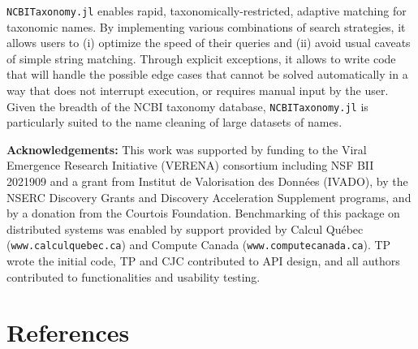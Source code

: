 \documentclass[11pt]{article}
\begin{document}
\texttt{NCBITaxonomy.jl} enables rapid, taxonomically-restricted,
adaptive matching for taxonomic names. By implementing various
combinations of search strategies, it allows users to (i) optimize the
speed of their queries and (ii) avoid usual caveats of simple string
matching. Through explicit exceptions, it allows to write code that will
handle the possible edge cases that cannot be solved automatically in a
way that does not interrupt execution, or requires manual input by the
user. Given the breadth of the NCBI taxonomy database,
\texttt{NCBITaxonomy.jl} is particularly suited to the name cleaning of
large datasets of names.

\textbf{Acknowledgements:} This work was supported by funding to the
Viral Emergence Research Initiative (VERENA) consortium including NSF
BII 2021909 and a grant from Institut de Valorisation des Données
(IVADO), by the NSERC Discovery Grants and Discovery Acceleration
Supplement programs, and by a donation from the Courtois Foundation.
Benchmarking of this package on distributed systems was enabled by
support provided by Calcul Québec (\texttt{www.calculquebec.ca}) and
Compute Canada (\texttt{www.computecanada.ca}). TP wrote the initial
code, TP and CJC contributed to API design, and all authors contributed
to functionalities and usability testing.

\hypertarget{references}{%
\section*{References}\label{references}}
\end{document}
